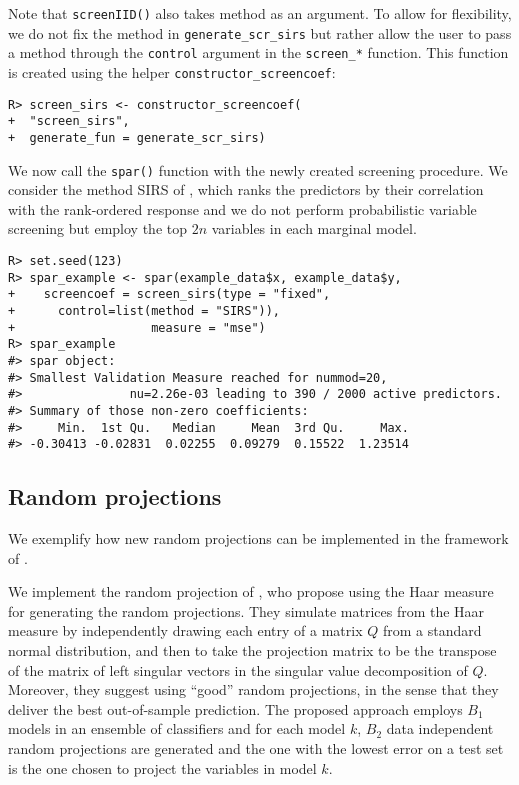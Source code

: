 \documentclass[
  article]{jss}
\begin{document}
Note that \texttt{screenIID()} also takes method as an argument. To
allow for flexibility, we do not fix the method in
\texttt{generate\_scr\_sirs} but rather allow the user to pass a method
through the \texttt{control} argument in the \texttt{screen\_*}
function. This function is created using the helper
\texttt{constructor\_screencoef}:

\begin{verbatim}
R> screen_sirs <- constructor_screencoef(
+  "screen_sirs", 
+  generate_fun = generate_scr_sirs)
\end{verbatim}

We now call the \texttt{spar()} function with the newly created
screening procedure. We consider the method SIRS of
\citet{zhu2011model}, which ranks the predictors by their correlation
with the rank-ordered response and we do not perform probabilistic
variable screening but employ the top \(2n\) variables in each marginal
model.

\begin{verbatim}
R> set.seed(123)      
R> spar_example <- spar(example_data$x, example_data$y,
+    screencoef = screen_sirs(type = "fixed",
+      control=list(method = "SIRS")),
+                   measure = "mse")
R> spar_example
#> spar object:
#> Smallest Validation Measure reached for nummod=20,
#>               nu=2.26e-03 leading to 390 / 2000 active predictors.
#> Summary of those non-zero coefficients:
#>     Min.  1st Qu.   Median     Mean  3rd Qu.     Max. 
#> -0.30413 -0.02831  0.02255  0.09279  0.15522  1.23514
\end{verbatim}

\subsection{Random projections}\label{random-projections-1}

We exemplify how new random projections can be implemented in the
framework of .

We implement the random projection of \citet{cannings2017random}, who
propose using the Haar measure for generating the random projections.
They simulate matrices from the Haar measure by independently drawing
each entry of a matrix \(Q\) from a standard normal distribution, and
then to take the projection matrix to be the transpose of the matrix of
left singular vectors in the singular value decomposition of \(Q\).
Moreover, they suggest using ``good'' random projections, in the sense
that they deliver the best out-of-sample prediction. The proposed
approach employs \(B_1\) models in an ensemble of classifiers and for
each model \(k\), \(B_2\) data independent random projections are
generated and the one with the lowest error on a test set is the one
chosen to project the variables in model \(k\).
\end{document}
